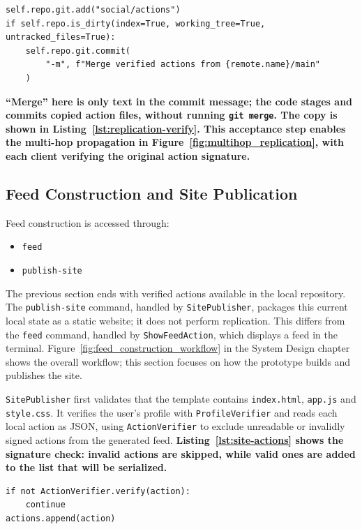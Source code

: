 \begin{lstlisting}[caption={Staging and committing replicated actions},label={lst:replication-commit}]
self.repo.git.add("social/actions")
if self.repo.is_dirty(index=True, working_tree=True, untracked_files=True):
    self.repo.git.commit(
        "-m", f"Merge verified actions from {remote.name}/main"
    )
\end{lstlisting}

\textbf{“Merge” here is only text in the commit message; the code stages and
commits copied action files, without running \texttt{git merge}. The copy is
shown in Listing~\ref{lst:replication-verify}. This acceptance step enables
the multi-hop propagation in Figure~\ref{fig:multihop_replication}, with each
client verifying the original action signature.}



\subsection{Feed Construction and Site Publication}
Feed construction is accessed through: 
\begin{itemize} 
    \item \texttt{feed} 
    \item \texttt{publish-site} 
\end{itemize}
The previous section ends with verified actions available in the
local repository. The \texttt{publish-site} command, handled by
\texttt{SitePublisher}, packages this current local state as a static website;
it does not perform replication. This differs from the \texttt{feed} command,
handled by \texttt{ShowFeedAction}, which displays a feed in the terminal.
Figure~\ref{fig:feed_construction_workflow} in the System Design chapter
shows the overall workflow; this section focuses on how the prototype builds
and publishes the site.

\texttt{SitePublisher} first validates that the template contains
\texttt{index.html}, \texttt{app.js} and \texttt{style.css}. It verifies the
user's profile with \texttt{ProfileVerifier} and reads each local action as
JSON, using \texttt{ActionVerifier} to exclude unreadable or invalidly signed
actions from the generated feed. \textbf{Listing~\ref{lst:site-actions}
shows the signature check: invalid actions are skipped, while valid ones are
added to the list that will be serialized.}

\begin{lstlisting}[caption={Including only verified actions in the site feed},label={lst:site-actions}]
if not ActionVerifier.verify(action):
    continue
actions.append(action)
\end{lstlisting}


